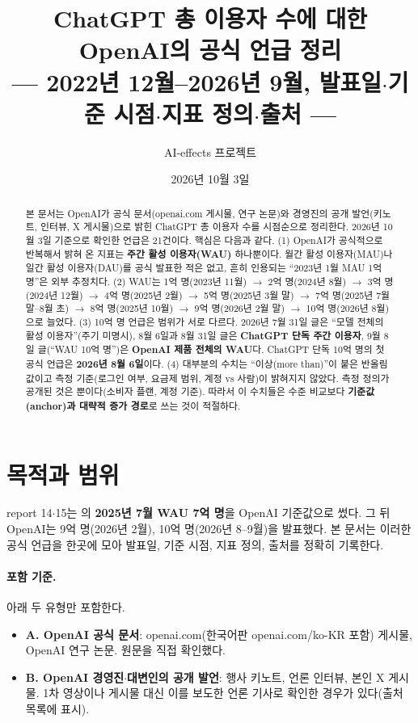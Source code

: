 \documentclass[11pt]{article}
\title{ChatGPT 총 이용자 수에 대한 OpenAI의 공식 언급 정리\\[2mm]
\large --- 2022년 12월--2026년 9월, 발표일$\cdot$기준 시점$\cdot$지표 정의$\cdot$출처 ---}
\author{AI-effects 프로젝트}
\date{2026년 10월 3일}
\begin{document}
\maketitle

\begin{abstract}
\noindent 본 문서는 OpenAI가 공식 문서(openai.com 게시물, 연구 논문)와 경영진의 공개 발언(키노트, 인터뷰, X 게시물)으로 밝힌 ChatGPT 총 이용자 수를 시점순으로 정리한다. 2026년 10월 3일 기준으로 확인한 언급은 21건이다. 핵심은 다음과 같다. (1) OpenAI가 공식적으로 반복해서 밝혀 온 지표는 \textbf{주간 활성 이용자(WAU)} 하나뿐이다. 월간 활성 이용자(MAU)나 일간 활성 이용자(DAU)를 공식 발표한 적은 없고, 흔히 인용되는 ``2023년 1월 MAU 1억 명''은 외부 추정치다. (2) WAU는 1억 명(2023년 11월) $\to$ 2억 명(2024년 8월) $\to$ 3억 명(2024년 12월) $\to$ 4억 명(2025년 2월) $\to$ 5억 명(2025년 3월 말) $\to$ 7억 명(2025년 7월 말--8월 초) $\to$ 8억 명(2025년 10월) $\to$ 9억 명(2026년 2월 말) $\to$ 10억 명(2026년 8월)으로 늘었다. (3) 10억 명 언급은 범위가 서로 다르다. 2026년 7월 31일 글은 ``모델 전체의 활성 이용자''(주기 미명시), 8월 6일과 8월 31일 글은 \textbf{ChatGPT 단독 주간 이용자}, 9월 8일 글(``WAU 10억 명'')은 \textbf{OpenAI 제품 전체의 WAU}다. ChatGPT 단독 10억 명의 첫 공식 언급은 \textbf{2026년 8월 6일}이다. (4) 대부분의 수치는 ``이상(more than)''이 붙은 반올림 값이고 측정 기준(로그인 여부, 요금제 범위, 계정 vs 사람)이 밝혀지지 않았다. 측정 정의가 공개된 것은 \textcite{chatterji-2025-how-people-use-chatgpt}뿐이다(소비자 플랜, 계정 기준). 따라서 이 수치들은 수준 비교보다 \textbf{기준값(anchor)과 대략적 증가 경로}로 쓰는 것이 적절하다.
\end{abstract}

\tableofcontents

\section{목적과 범위}

report 14$\cdot$15는 \textcite{chatterji-2025-how-people-use-chatgpt}의 \textbf{2025년 7월 WAU 7억 명}을 OpenAI 기준값으로 썼다. 그 뒤 OpenAI는 9억 명(2026년 2월), 10억 명(2026년 8--9월)을 발표했다. 본 문서는 이러한 공식 언급을 한곳에 모아 발표일, 기준 시점, 지표 정의, 출처를 정확히 기록한다.

\paragraph{포함 기준.} 아래 두 유형만 포함한다.
\begin{itemize}
  \item \textbf{A. OpenAI 공식 문서}: openai.com(한국어판 openai.com/ko-KR 포함) 게시물, OpenAI 연구 논문. 원문을 직접 확인했다.
  \item \textbf{B. OpenAI 경영진$\cdot$대변인의 공개 발언}: 행사 키노트, 언론 인터뷰, 본인 X 게시물. 1차 영상이나 게시물 대신 이를 보도한 언론 기사로 확인한 경우가 있다(출처 목록에 표시).
\end{itemize}
\end{document}
